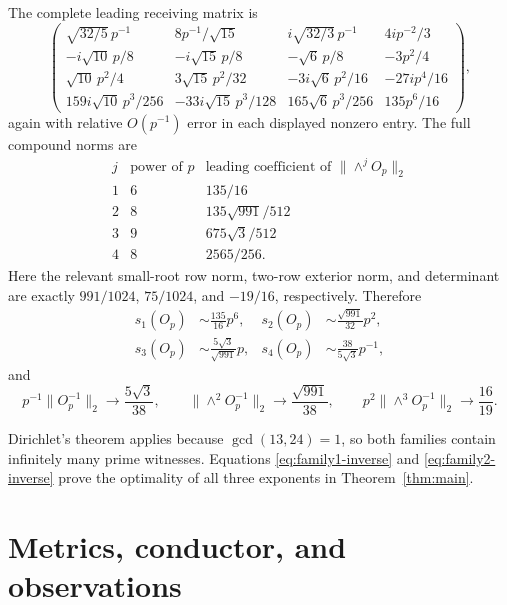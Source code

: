 The complete leading receiving matrix is
\[
\begin{pmatrix}
\sqrt{32/5}\,p^{-1}&8p^{-1}/\sqrt{15}&i\sqrt{32/3}\,p^{-1}&4ip^{-2}/3\\
-i\sqrt{10}\,p/8&-i\sqrt{15}\,p/8&-\sqrt6\,p/8&-3p^2/4\\
\sqrt{10}\,p^2/4&3\sqrt{15}\,p^2/32&-3i\sqrt6\,p^2/16&-27ip^4/16\\
159i\sqrt{10}\,p^3/256&-33i\sqrt{15}\,p^3/128&
165\sqrt6\,p^3/256&135p^6/16
\end{pmatrix},
\]
again with relative \(O(p^{-1})\) error in each displayed nonzero entry.
The full compound norms are
\begin{equation}\label{eq:family2-compounds}
\begin{array}{c|c|c}
j&\text{power of }p&\text{leading coefficient of }\|\wedge^jO_p\|_2\\ \hline
1&6&135/16\\
2&8&135\sqrt{991}/512\\
3&9&675\sqrt3/512\\
4&8&2565/256.
\end{array}
\end{equation}
Here the relevant small-root row norm, two-row exterior norm, and determinant
are exactly \(991/1024\), \(75/1024\), and \(-19/16\), respectively. Therefore
\begin{equation}\label{eq:family2-singular}
\begin{aligned}
s_1(O_p)&\sim\frac{135}{16}p^6,&
s_2(O_p)&\sim\frac{\sqrt{991}}{32}p^2,\\
s_3(O_p)&\sim\frac{5\sqrt3}{\sqrt{991}}p,&
s_4(O_p)&\sim\frac{38}{5\sqrt3}p^{-1},
\end{aligned}
\end{equation}
and
\begin{equation}\label{eq:family2-inverse}
 p^{-1}\|O_p^{-1}\|_2\to\frac{5\sqrt3}{38},
 \qquad
 \|\wedge^2O_p^{-1}\|_2\to\frac{\sqrt{991}}{38},
 \qquad
 p^2\|\wedge^3O_p^{-1}\|_2\to\frac{16}{19}.
\end{equation}

Dirichlet's theorem applies because \(\gcd(13,24)=1\), so both families
contain infinitely many prime witnesses. Equations
\eqref{eq:family1-inverse} and \eqref{eq:family2-inverse} prove the optimality
of all three exponents in Theorem~\ref{thm:main}.

\section{Metrics, conductor, and observations}\label{sec:transport}

